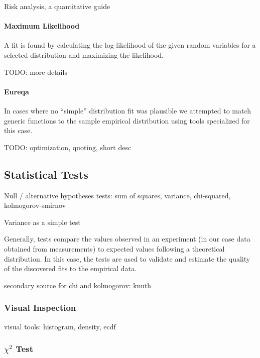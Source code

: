  Risk analysis, a quantitative guide \cite[pp.~99-143]{vose2000risk}


\paragraph{Maximum Likelihood}
A fit is found by calculating the log-likelihood of the given random variables for a selected distribution and maximizing the likelihood.

TODO: more details


\paragraph{Eureqa}
In cases where no ``simple'' distribution fit was plausible we attempted to match generic functions to the sample empirical distribution using tools specialized for this case.

TODO: optimization, quoting, short desc





\subsection{Statistical Tests}

Null / alternative hypotheses
tests: sum of squares, variance, chi-squared, kolmogorov-smirnov

Variance as a simple test

Generally, tests compare the values observed in an experiment (in our case data obtained from measurements) to expected values following a theoretical distribution. In this case, the tests are used to validate and estimate the quality of the discovered fits to the empirical data.

secondary source for chi and kolmogorov: knuth \cite{Knuth:1997:ACP:270146}


\subsubsection{Visual Inspection}
visual tools: histogram, density, ecdf


\subsubsection{$\chi^2$ Test}


